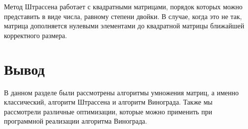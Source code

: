 Метод Штрассена работает с квадратными матрицами, порядок которых можно представить в виде числа, равному степени двойки. 
В случае, когда это не так, матрица дополняется нулевыми элементами до квадратной матрицы ближайшей корректного размера.

\section*{Вывод}
В данном разделе были рассмотрены алгоритмы умножения матриц, а именно классический, алгоритм Штрассена и алгоритм Винограда. 
Также мы рассмотрели различные оптимизации, которые можно применить при программной реализации алгоритма Винограда.
